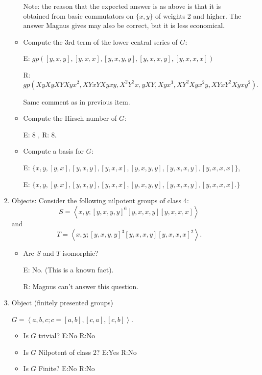 \documentclass{article}
\begin{document}
\begin{enumerate}
\begin{itemize}
Note: the reason that the expected answer is as above is that it is obtained from basic commutators on $\{x,y\}$ of weights 2 and higher. The answer Magnus gives may also be correct, but it is less economical.

\item Compute the 3rd term of the lower central series of $G:$

E: $gp\left([y,x,y],[y,x,x],[y,x,y,y],[y,x,x,y],[y,x,x,x]\right)$

R: $gp \left(XyXyXYXyx^2, XYxYXyxy, X^2Y^2x,yXY,Xy x^3, XY^2Xyx^2y,XYxY^2Xyxy^2 \right).$

Same comment as in previous item. 

\item Compute the Hirsch number of $G:$

E: 8 , R: 8.

\item Compute a basis for $G$:

E: $\{ x,y, [y,x],[y,x,y],[y,x,x],[y,x,y,y],[y,x,x,y],[y,x,x,x] \}$, 

E: $\{ x,y, [y,x],[y,x,y],[y,x,x],[y,x,y,y],[y,x,x,y],[y,x,x,x]. \}$ 

\end{itemize}

\item Objects: Consider the following nilpotent groups of class 4:
\[S=\left<x,y ; [y,x,y,y]^6 [y,x,x,y] [y,x,x,x] \right>\]and
\[T=\left<x,y ; [y,x,y,y]^3 [y,x,x,y] [y,x,x,x]^2\right>.\]

\begin{itemize}
\item Are $S$ and $T$ isomorphic?

E: No. (This is a known fact).

R: Magnus can't answer this question.

\end{itemize}

\item Object (finitely presented groups)

$G=\left<a,b,c; c=[a,b], [c,a], [c,b] \right>$.

\begin{itemize}

\item Is $G$ trivial? E:No  R:No 

\item Is $G$ Nilpotent of class 2? E:Yes R:No

\item Is $G$ Finite? E:No R:No


\end{itemize}
\end{enumerate}
\end{document}

